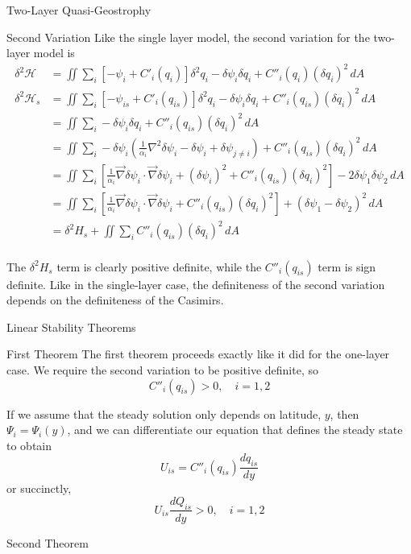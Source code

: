 \documentclass[12pt]{article}
\begin{document}
\begin{section}{Two-Layer Quasi-Geostrophy}
    \begin{subsection}{Second Variation}
        Like the single layer model, the second variation for the two-layer model is
        \begin{align*}
            \delta^2 \mathcal{H} &= \iint \sum_i \left[ - \psi_i + C'_i(q_i) \right]  \delta^2 q_i  - \delta \psi_i \delta q_i +  C''_i(q_i) (\delta q_i)^2  \, dA \\
            \delta^2 \mathcal{H}_s &= \iint \sum_i \left[ - \psi_{is} + C'_i(q_{is}) \right]  \delta^2 q_i  - \delta \psi_i \delta q_i +  C''_i(q_{is}) (\delta q_i)^2  \, dA \\
            &= \iint \sum_i - \delta \psi_i \delta q_i +  C''_i(q_{is}) (\delta q_i)^2  \, dA \\
            &= \iint \sum_i - \delta \psi_i \left( \frac{1}{\alpha_i} \nabla^2 \delta \psi_i - \delta\psi_i + \delta\psi_{j \ne i} \right) +  C''_i(q_{is}) (\delta q_i)^2  \, dA \\
            &= \iint \sum_i \left[ \frac{1}{\alpha_i} \vec\nabla\delta\psi_i \cdot \vec\nabla\delta\psi_i + (\delta\psi_i)^2 + C''_i(q_{is}) (\delta q_i)^2 \right]  - 2\delta\psi_1\delta\psi_2 \, dA \\
            &= \iint \sum_i \left[ \frac{1}{\alpha_i} \vec\nabla\delta\psi_i \cdot \vec\nabla\delta\psi_i + C''_i(q_{is}) (\delta q_i)^2 \right]+ (\delta\psi_1 - \delta\psi_2)^2 \, dA \\
            &= \delta^2 H_s + \iint \sum_i C''_i(q_{is})(\delta q_i)^2 \, dA \\
        \end{align*}

        The $\delta^2 H_s$ term is clearly positive definite, while the $C''_i(q_{is})$ term is sign definite. Like in the single-layer case, the definiteness of the second variation depends on the definiteness of the Casimirs.
    \end{subsection}

    \begin{subsection}{Linear Stability Theorems}
        \begin{subsubsection}{First Theorem}
            The first theorem proceeds exactly like it did for the one-layer case. We require the second variation to be positive definite, so
            $$
            C''_i(q_{is}) > 0, \quad i=1,2
            $$

            If we assume that the steady solution only depends on latitude, $y$, then $\Psi_i = \Psi_i(y)$, and we can differentiate our equation that defines the steady state to obtain
            $$
            U_{is} = C''_i(q_{is}) \frac{dq_{is}}{dy}
            $$
            or succinctly,
            $$
            U_{is} \frac{d Q_{is}}{dy} > 0, \quad i=1,2
            $$
        \end{subsubsection}
        \begin{subsubsection}{Second Theorem}
        \end{subsubsection}
    \end{subsection}


\end{section}
\end{document}
